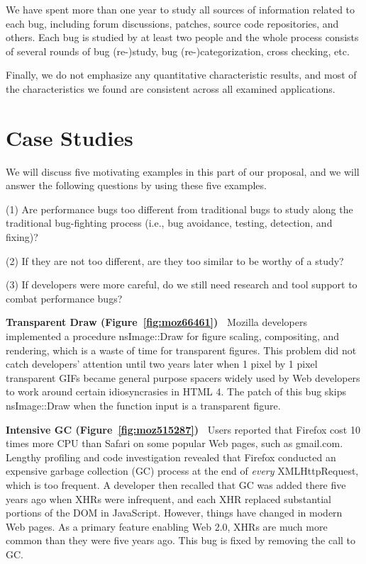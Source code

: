 We have spent more than one year to study all sources of information related
to each bug, including forum discussions, patches, source code repositories, 
and others. Each bug is studied by at least two people and
the whole process consists of several rounds of bug (re-)study, 
bug (re-)categorization, cross checking, etc. 

Finally, we do not emphasize any quantitative characteristic results, and
most of the characteristics we found are consistent across
all examined applications.


\section{Case Studies}
\label{lab:case}
We will discuss five motivating examples in this part of our proposal, and 
we will answer the following questions by using these five examples. 

(1) Are performance bugs too different from traditional bugs to study along
the traditional bug-fighting process (i.e.,
bug avoidance, testing, detection, and fixing)?

(2) If they are not too different, are they too similar to be worthy of 
a study?

(3) If developers were more careful, do we still need research and tool 
support to combat performance bugs?


{\bf Transparent Draw (Figure~\ref{fig:moz66461})\ } 
Mozilla developers implemented a procedure nsImage::Draw for
figure scaling, compositing, and rendering, which is 
a waste of time for transparent figures. This problem did not catch 
developers' attention until two years later when 1 pixel by 1 pixel 
transparent GIFs became general purpose spacers widely used by Web
developers to work around certain idiosyncrasies in HTML 4.
The patch of this bug skips
nsImage::Draw when the function input is a transparent figure.

{\bf Intensive GC (Figure~\ref{fig:moz515287})\ }
Users reported that Firefox cost 10 times more CPU than Safari on
some popular Web pages, such as gmail.com.
Lengthy profiling and code investigation revealed that
Firefox conducted an expensive
garbage collection (GC) process at the end of {\it every}
XMLHttpRequest, which is too frequent.
A developer then recalled that GC was added there
five years ago when
XHRs were infrequent, and each XHR replaced substantial portions of the 
DOM in JavaScript. However, things have changed in modern Web pages.
As a primary feature enabling Web 2.0, 
XHRs are much more common 
than they were five years ago.
This bug is fixed by removing the call to GC.


